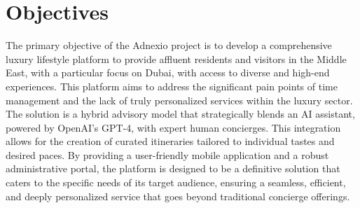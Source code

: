 \section{Objectives}

The primary objective of the Adnexio project is to develop a comprehensive luxury lifestyle platform to provide affluent residents and visitors in the Middle East, with a particular focus on Dubai, with access to diverse and high-end experiences. This platform aims to address the significant pain points of time management and the lack of truly personalized services within the luxury sector. The solution is a hybrid advisory model that strategically blends an AI assistant, powered by OpenAI's GPT-4, with expert human concierges. This integration allows for the creation of curated itineraries tailored to individual tastes and desired paces. By providing a user-friendly mobile application and a robust administrative portal, the platform is designed to be a definitive solution that caters to the specific needs of its target audience, ensuring a seamless, efficient, and deeply personalized service that goes beyond traditional concierge offerings.
